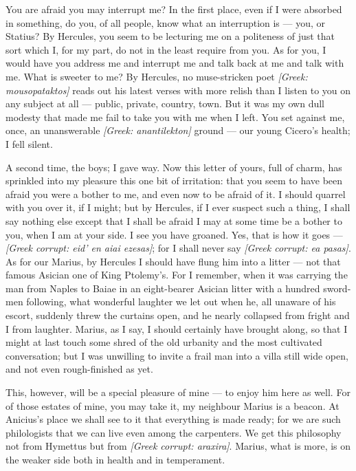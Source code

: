 

 You are afraid you may interrupt me? In the first place, even if I were absorbed in something, do you, of all people, know what an interruption is — you, or Statius? By Hercules, you seem to be lecturing me on a politeness of just that sort which I, for my part, do not in the least require from you. As for you, I would have you address me and interrupt me and talk back at me and talk with me. What is sweeter to me? By Hercules, no muse-stricken poet \textit{[Greek: mousopataktos]} reads out his latest verses with more relish than I listen to you on any subject at all — public, private, country, town. But it was my own dull modesty that made me fail to take you with me when I left. You set against me, once, an unanswerable \textit{[Greek: anantilekton]} ground — our young Cicero's health; I fell silent.

 A second time, the boys; I gave way. Now this letter of yours, full of charm, has sprinkled into my pleasure this one bit of irritation: that you seem to have been afraid you were a bother to me, and even now to be afraid of it. I should quarrel with you over it, if I might; but by Hercules, if I ever suspect such a thing, I shall say nothing else except that I shall be afraid I may at some time be a bother to you, when I am at your side. I see you have groaned. Yes, that is how it goes — \textit{[Greek corrupt: eid' en aiai ezesas]}; for I shall never say \textit{[Greek corrupt: ea pasas]}. As for our Marius, by Hercules I should have flung him into a litter — not that famous Asician one of King Ptolemy's. For I remember, when it was carrying the man from Naples to Baiae in an eight-bearer Asician litter with a hundred sword-men following, what wonderful laughter we let out when he, all unaware of his escort, suddenly threw the curtains open, and he nearly collapsed from fright and I from laughter. Marius, as I say, I should certainly have brought along, so that I might at last touch some shred of the old urbanity and the most cultivated conversation; but I was unwilling to invite a frail man into a villa still wide open, and not even rough-finished as yet.

 This, however, will be a special pleasure of mine — to enjoy him here as well. For of those estates of mine, you may take it, my neighbour Marius is a beacon. At Anicius's place we shall see to it that everything is made ready; for we are such philologists that we can live even among the carpenters. We get this philosophy not from Hymettus but from \textit{[Greek corrupt: araxira]}. Marius, what is more, is on the weaker side both in health and in temperament.

